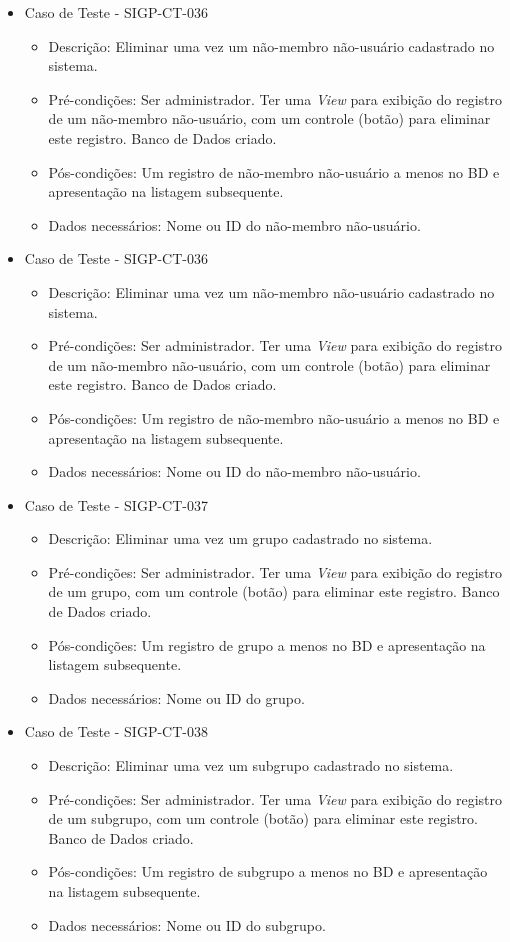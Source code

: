 \documentclass[11pt, a4paper]{book}
\begin{document}
\begin{itemize}
\newpage

	\item Caso de Teste - SIGP-CT-036
	\begin{itemize}
	\item Descrição: Eliminar uma vez um não-membro não-usuário cadastrado no sistema.
	\item Pré-condições: Ser administrador. Ter uma \emph{View} para exibição do registro de um não-membro não-usuário, com um controle (botão) para eliminar este registro. Banco de Dados criado.
	\item Pós-condições: Um registro de não-membro não-usuário a menos no BD e apresentação na listagem subsequente.
	\item Dados necessários: Nome ou ID do não-membro não-usuário.
	\end{itemize}

	\item Caso de Teste - SIGP-CT-036
	\begin{itemize}
	\item Descrição: Eliminar uma vez um não-membro não-usuário cadastrado no sistema.
	\item Pré-condições: Ser administrador. Ter uma \emph{View} para exibição do registro de um não-membro não-usuário, com um controle (botão) para eliminar este registro. Banco de Dados criado.
	\item Pós-condições: Um registro de não-membro não-usuário a menos no BD e apresentação na listagem subsequente.
	\item Dados necessários: Nome ou ID do não-membro não-usuário.
	\end{itemize}

	\item Caso de Teste - SIGP-CT-037
	\begin{itemize}
	\item Descrição: Eliminar uma vez um grupo cadastrado no sistema.
	\item Pré-condições: Ser administrador. Ter uma \emph{View} para exibição do registro de um grupo, com um controle (botão) para eliminar este registro. Banco de Dados criado.
	\item Pós-condições: Um registro de grupo a menos no BD e apresentação na listagem subsequente.
	\item Dados necessários: Nome ou ID do grupo.
	\end{itemize}

	\item Caso de Teste - SIGP-CT-038
	\begin{itemize}
	\item Descrição: Eliminar uma vez um subgrupo cadastrado no sistema.
	\item Pré-condições: Ser administrador. Ter uma \emph{View} para exibição do registro de um subgrupo, com um controle (botão) para eliminar este registro. Banco de Dados criado.
	\item Pós-condições: Um registro de subgrupo a menos no BD e apresentação na listagem subsequente.
	\item Dados necessários: Nome ou ID do subgrupo.
	\end{itemize}


\end{itemize}
\end{document}
